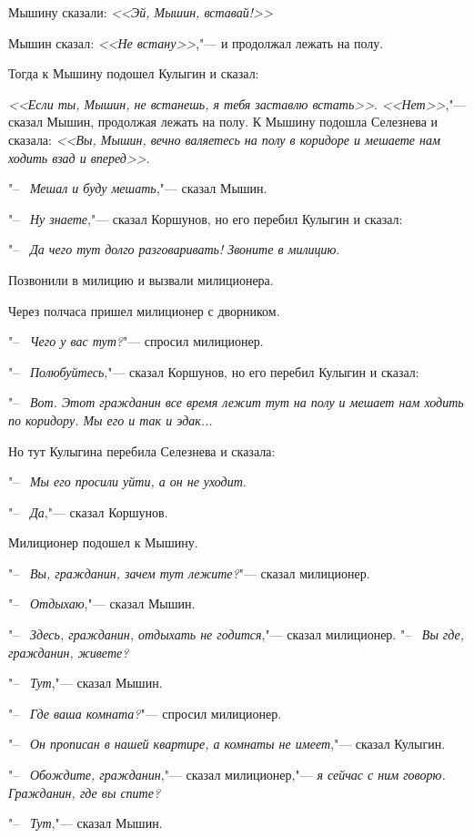 Мышину сказали: \textit{<<Эй, Мышин, вставай!>>}

Мышин сказал: \textit{<<Не встану>>},"--- и продолжал лежать на полу.

Тогда к Мышину подошел Кулыгин и сказал:

\textit{<<Если ты, Мышин, не встанешь, я тебя заставлю встать>>}. \textit{<<Нет>>},"--- сказал Мышин, продолжая лежать на полу. К Мышину подошла Селезнева и сказала: \textit{<<Вы, Мышин, вечно валяетесь на полу в коридоре и мешаете нам ходить взад и вперед>>}.

"--~ \textit{Мешал и буду мешать},"--- сказал Мышин.

"--~ \textit{Ну знаете},"--- сказал Коршунов, но его перебил Кулыгин и сказал:

"--~ \textit{Да чего тут долго разговаривать! Звоните в милицию}.

Позвонили в милицию и вызвали милиционера.

Через полчаса пришел милиционер с дворником.

"--~ \textit{Чего у вас тут?}"--- спросил милиционер.

"--~ \textit{Полюбуйтесь},"--- сказал Коршунов, но его перебил Кулыгин и сказал:

"--~ \textit{Вот. Этот гражданин все время лежит тут на полу и мешает нам ходить по коридору. Мы его и так и эдак...}

Но тут Кулыгина перебила Селезнева и сказала:

"--~ \textit{Мы его просили уйти, а он не уходит}.

"--~ \textit{Да},"--- сказал Коршунов.

Милиционер подошел к Мышину.

"--~ \textit{Вы, гражданин, зачем тут лежите?}"--- сказал милиционер.

"--~ \textit{Отдыхаю},"--- сказал Мышин.

"--~ \textit{Здесь, гражданин, отдыхать не годится},"--- сказал милиционер. "--~ \textit{Вы где, гражданин, живете?}

"--~ \textit{Тут},"--- сказал Мышин.

"--~ \textit{Где ваша комната?}"--- спросил милиционер.

"--~ \textit{Он прописан в нашей квартире, а комнаты не имеет},"--- сказал Кулыгин.

"--~ \textit{Обождите, гражданин},"--- сказал милиционер,"--- \textit{я сейчас с ним говорю. Гражданин, где вы спите?}

"--~ \textit{Тут},"--- сказал Мышин.

